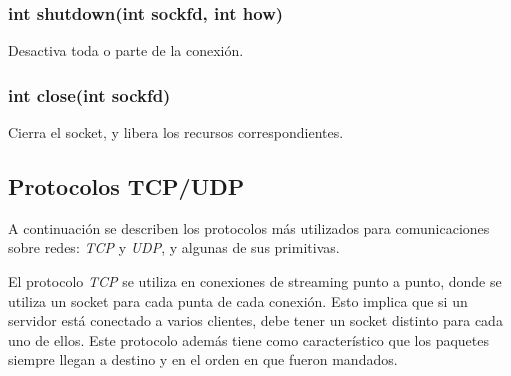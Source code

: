 \documentclass[a4paper, twoside]{article}
\begin{document}
\subsubsection{int shutdown(int sockfd, int how)}
Desactiva toda o parte de la conexión.\\

\subsubsection{int close(int sockfd)}
Cierra el socket, y libera los recursos correspondientes.


\subsection{Protocolos TCP/UDP}
A continuación se describen los protocolos más utilizados para comunicaciones sobre redes: \emph{TCP} y \emph{UDP}, y algunas de sus primitivas.

El protocolo \emph{TCP} se utiliza en conexiones de streaming punto a punto, donde se utiliza un socket para cada punta de cada conexión. Esto implica que si un servidor está conectado a varios clientes, debe tener un socket distinto para cada uno de ellos. Este protocolo además tiene como característico que los paquetes siempre llegan a destino y en el orden en que fueron mandados.
\end{document}

